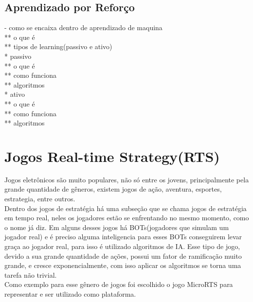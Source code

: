 \subsection{Aprendizado por Reforço} 
- como se encaixa dentro de aprendizado de maquina \\
** o que é \\
** tipos de learning(passivo e ativo) \\
* passivo \\
** o que é \\
** como funciona \\
** algoritmos \\
* ativo \\
** o que é \\
** como funciona \\
** algoritmos \\


\section{Jogos Real-time Strategy(RTS)} 

Jogos eletrônicos são muito populares, não só entre os jovens, principalmente pela grande quantidade de gêneros, existem jogos de ação, aventura, esportes, estrategia, entre outros. \\
Dentro dos jogos de estratégia há uma subseção que se chama jogos de estratégia em tempo real, neles os jogadores estão se enfrentando no mesmo momento, como o nome já diz. Em alguns desses jogos há BOTs(jogadores que simulam um jogador real) e é preciso alguma inteligencia para esses BOTs conseguirem levar graça ao jogador real, para isso é utilizado algoritmos de IA. Esse tipo de jogo, devido a sua grande quantidade de ações, possui um fator de ramificação muito grande, e cresce exponencialmente, com isso aplicar os algoritmos se torna uma tarefa não trivial.  \\
Como exemplo para esse gênero de jogos foi escolhido o jogo MicroRTS para representar e ser utilizado como plataforma. 

